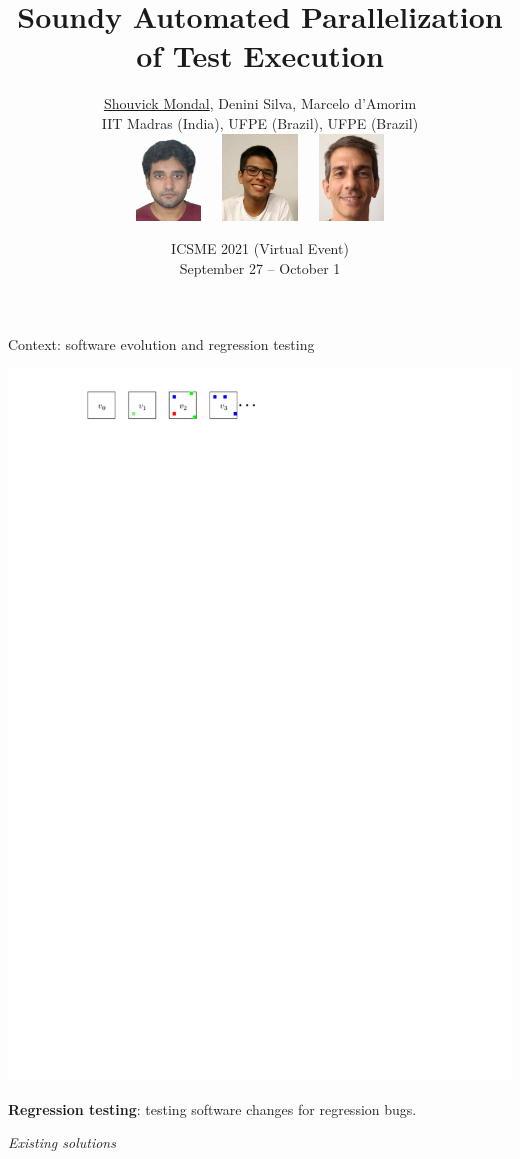 \documentclass{beamer}
\title[\color{white}ICSME 2021 Research Track Presentation.\hspace{14mm}\disp] %
{Soundy Automated Parallelization\\of Test Execution}
\author[Shouvick Mondal \textit{et al}.] %
{\underline{Shouvick Mondal}, Denini Silva, Marcelo d'Amorim\\\vspace{2mm}
{\scriptsize IIT Madras (India), UFPE (Brazil), UFPE (Brazil)}
\\\vspace{2mm}
\includegraphics[width=0.13\textwidth]{images/shouvick2.jpg}~~~\includegraphics[width=0.15\textwidth]{images/denini.jpg}~~~\includegraphics[width=0.13\textwidth]{images/marcelo.jpg}}
\date{ICSME 2021 (Virtual Event)\\{\scriptsize September 27 -- October 1}} %
\begin{document}
\begingroup
\renewcommand{\disp}{}
\begin{frame}
	\titlepage
\end{frame}
\endgroup

\addtocounter{framenumber}{-1}

\begin{frame}{Context: software evolution and regression testing}
\vspace{-3.75mm}
\begin{center}
	{\includegraphics[width=\linewidth]{images/evolution.pdf}}
\end{center}
\vspace{-4mm}
\begin{center}
{\fontsize{10}{10}\selectfont
{\rsm \textbf{Regression testing}}: testing software changes for regression bugs.}
\end{center}\pause
\textit{Existing solutions}

\end{frame}
\end{document}
